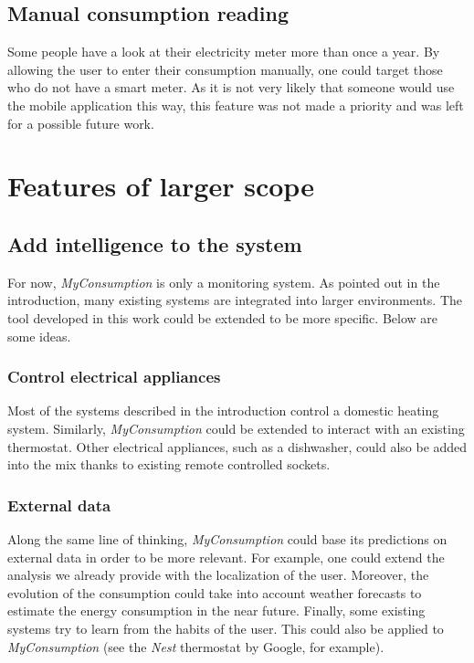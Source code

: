 \documentclass[a4paper, oneside, 11pt]{book}
\begin{document}
\subsection{Manual consumption reading}
Some people have a look at their electricity meter more than once a year. By allowing the user to enter their consumption manually, one could target those who do not have a smart meter. As it is not very likely that someone would use the mobile application this way, this feature was not made a priority and was left for a possible future work.

\section{Features of larger scope }

\subsection{Add intelligence to the system}
For now, \textit{MyConsumption} is only a monitoring system. As pointed out in the introduction, many existing systems are integrated into larger environments. The tool developed in this work could be extended to be more specific. Below are some ideas.

\subsubsection{Control electrical appliances}
Most of the systems described in the introduction control a domestic heating system. Similarly, \textit{MyConsumption} could be extended to interact with an existing thermostat. Other electrical appliances, such as a dishwasher, could also be added into the mix thanks to existing remote controlled sockets.

\subsubsection{External data}
Along the same line of thinking, \textit{MyConsumption} could base its predictions on external data in order to be more relevant. For example, one could extend the analysis we already provide with the localization of the user. Moreover, the evolution of the consumption could take into account weather forecasts to estimate the energy consumption in the near future. Finally, some existing systems try to learn from the habits of the user. This could also be applied to \textit{MyConsumption} (see the \textit{Nest} thermostat by Google, for example). 
\end{document}
